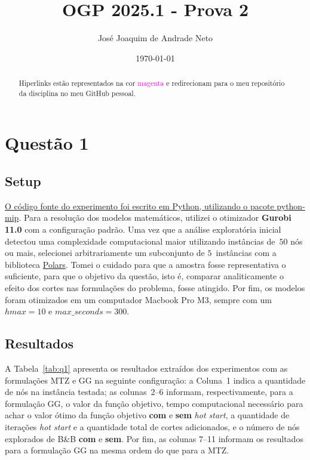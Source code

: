 \documentclass{article}
\title{OGP 2025.1 - Prova 2}
\author{José Joaquim de Andrade Neto}
\date{\today}
\begin{document}
\maketitle

\begin{abstract}
	Hiperlinks estão representados na cor \textcolor{magenta}{magenta} e redirecionam para o meu repositório da disciplina no meu GitHub pessoal.
\end{abstract}

\section{Questão 1}

\subsection{Setup}

\href{https://github.com/jose-joaquim/ogp-ufmg20251/blob/main/2nd-exam/question1.py}{O código fonte do experimento foi escrito em Python, utilizando o pacote python-mip}.
Para a resolução dos modelos matemáticos, utilizei o otimizador \textbf{Gurobi 11.0} com a configuração padrão.
Uma vez que a análise exploratória inicial detectou uma complexidade computacional maior utilizando instâncias de~$50$ nós ou mais, selecionei arbitrariamente um subconjunto de $5$~instâncias com a biblioteca \href{https://pola.rs/}{Polars}.
Tomei o cuidado para que a amostra fosse representativa o suficiente, para que o objetivo da questão, isto é, comparar analiticamente o efeito dos cortes nas formulações do problema, fosse atingido.
Por fim, os modelos foram otimizados em um computador Macbook Pro M3, sempre com um $hmax = 10$ e $max\_seconds = 300$.

\subsection{Resultados}

A Tabela~\ref{tab:q1} apresenta os resultados extraídos dos experimentos com as formulações MTZ e GG na seguinte configuração: a Coluna~1 indica a quantidade de nós na instância testada; as colunas~2--6 informam, respectivamente, para a formulação GG, o valor da função objetivo, tempo computacional necessário para achar o valor ótimo da função objetivo \textbf{com} e \textbf{sem} \textsl{hot start}, a quantidade de iterações \textsl{hot start} e a quantidade total de cortes adicionados, e o número de nós explorados de B\&B \textbf{com} e \textbf{sem}.
Por fim, as colunas 7--11 informam os resultados para a formulação GG na mesma ordem do que para a MTZ.
\end{document}
